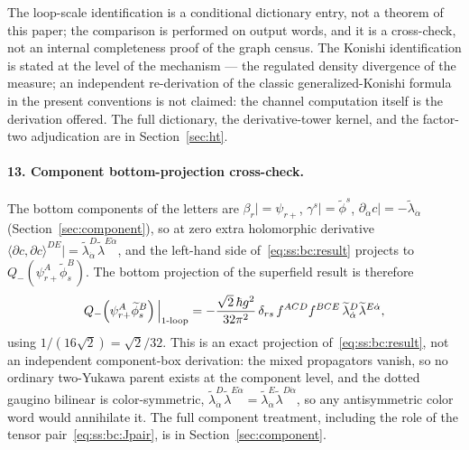 \begin{remark}\label{rem:ss:bc:htstatus}
The loop-scale identification is a conditional dictionary entry, not a theorem
of this paper; the comparison is performed on output words, and it is a
cross-check, not an internal completeness proof of the graph census. The
Konishi identification is stated at the level of the mechanism --- the
regulated density divergence of the measure; an independent re-derivation of
the classic generalized-Konishi formula in the present conventions is not
claimed: the channel computation itself is the derivation offered. The full
dictionary, the derivative-tower kernel, and the factor-two adjudication are
in Section~\ref{sec:ht}.
\end{remark}

\paragraph{13. Component bottom-projection cross-check.}
The bottom components of the letters are $\beta_{r}|=\psi_{r+}$,
$\gamma^{s}|=\widetilde\phi^{s}$,
$\partial_{\dot\alpha}c|=-\widetilde\lambda_{\dot\alpha}$
(Section~\ref{sec:component}), so at zero extra holomorphic derivative
$\langle\partial c,\partial c\rangle^{DE}\big|
=\widetilde\lambda_{\dot\alpha}^{D}\widetilde\lambda^{E\dot\alpha}$, and the
left-hand side of~\eqref{eq:ss:bc:result} projects to
$Q_{-}(\psi_{r+}^{A}\widetilde\phi_{s}^{B})$. The bottom projection of the
superfield result is therefore
\begin{equation}\label{eq:ss:bc:component}
Q_{-}\!\left(\psi_{r+}^{A}\widetilde\phi_{s}^{B}\right)
\Big|_{\mathrm{1\text{-}loop}}
=-\frac{\sqrt2\,\hbar g^{2}}{32\pi^{2}}\,
\delta_{rs}\,f^{ACD}f^{BCE}\,
\widetilde\lambda_{\dot\alpha}^{D}\widetilde\lambda^{E\dot\alpha} ,
\end{equation}
using $1/(16\sqrt2)=\sqrt2/32$. This is an exact projection
of~\eqref{eq:ss:bc:result}, not an independent component-box derivation: the
mixed propagators vanish, so no ordinary two-Yukawa parent exists at the
component level, and the dotted gaugino bilinear is color-symmetric,
$\widetilde\lambda_{\dot\alpha}^{D}\widetilde\lambda^{E\dot\alpha}
=\widetilde\lambda_{\dot\alpha}^{E}\widetilde\lambda^{D\dot\alpha}$, so any
antisymmetric color word would annihilate it. The full component treatment,
including the role of the tensor pair~\eqref{eq:ss:bc:Jpair}, is in
Section~\ref{sec:component}.
